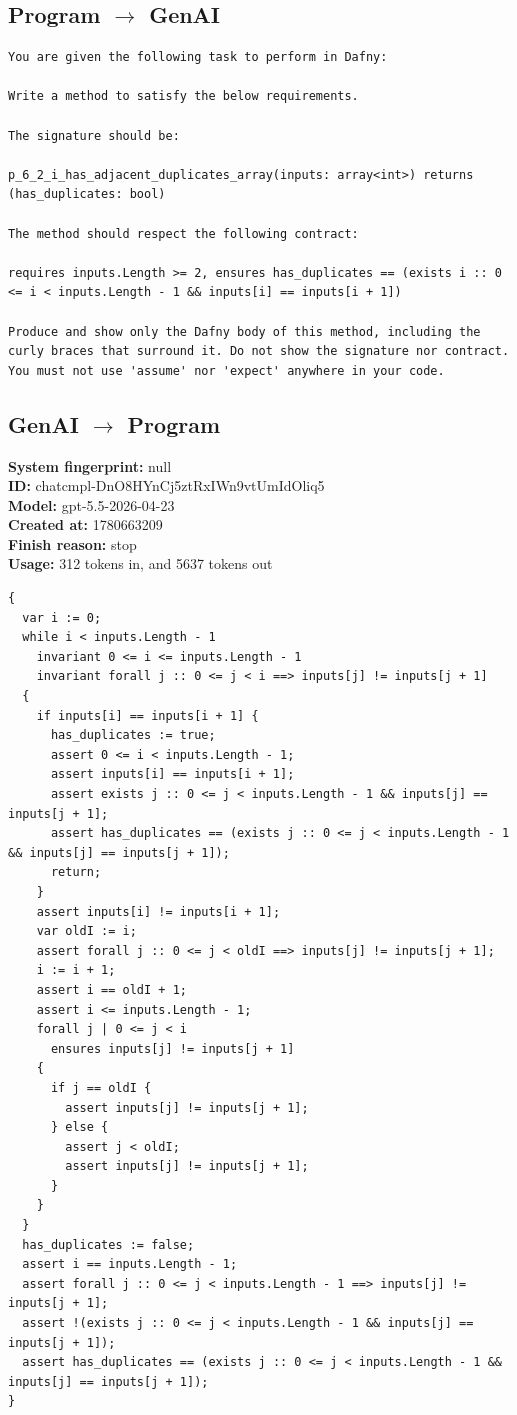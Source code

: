 \documentclass{article}
\begin{document}
\subsection*{Program $\rightarrow$ GenAI}
\begin{lstlisting}
You are given the following task to perform in Dafny:

Write a method to satisfy the below requirements.

The signature should be:

p_6_2_i_has_adjacent_duplicates_array(inputs: array<int>) returns (has_duplicates: bool)

The method should respect the following contract:

requires inputs.Length >= 2, ensures has_duplicates == (exists i :: 0 <= i < inputs.Length - 1 && inputs[i] == inputs[i + 1])

Produce and show only the Dafny body of this method, including the curly braces that surround it. Do not show the signature nor contract. You must not use 'assume' nor 'expect' anywhere in your code.
\end{lstlisting}
\subsection*{GenAI $\rightarrow$ Program}
\textbf{System fingerprint: }null
\\\textbf{ID: }chatcmpl-DnO8HYnCj5ztRxIWn9vtUmIdOliq5
\\\textbf{Model: }gpt-5.5-2026-04-23
\\\textbf{Created at: }1780663209
\\\textbf{Finish reason: }stop
\\\textbf{Usage: }312 tokens in, and 5637 tokens out
\begin{lstlisting}
{
  var i := 0;
  while i < inputs.Length - 1
    invariant 0 <= i <= inputs.Length - 1
    invariant forall j :: 0 <= j < i ==> inputs[j] != inputs[j + 1]
  {
    if inputs[i] == inputs[i + 1] {
      has_duplicates := true;
      assert 0 <= i < inputs.Length - 1;
      assert inputs[i] == inputs[i + 1];
      assert exists j :: 0 <= j < inputs.Length - 1 && inputs[j] == inputs[j + 1];
      assert has_duplicates == (exists j :: 0 <= j < inputs.Length - 1 && inputs[j] == inputs[j + 1]);
      return;
    }
    assert inputs[i] != inputs[i + 1];
    var oldI := i;
    assert forall j :: 0 <= j < oldI ==> inputs[j] != inputs[j + 1];
    i := i + 1;
    assert i == oldI + 1;
    assert i <= inputs.Length - 1;
    forall j | 0 <= j < i
      ensures inputs[j] != inputs[j + 1]
    {
      if j == oldI {
        assert inputs[j] != inputs[j + 1];
      } else {
        assert j < oldI;
        assert inputs[j] != inputs[j + 1];
      }
    }
  }
  has_duplicates := false;
  assert i == inputs.Length - 1;
  assert forall j :: 0 <= j < inputs.Length - 1 ==> inputs[j] != inputs[j + 1];
  assert !(exists j :: 0 <= j < inputs.Length - 1 && inputs[j] == inputs[j + 1]);
  assert has_duplicates == (exists j :: 0 <= j < inputs.Length - 1 && inputs[j] == inputs[j + 1]);
}
\end{lstlisting}
\end{document}
